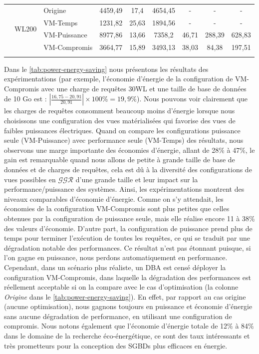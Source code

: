 \begin{table}
\begin{tabular}{cllcccccc}
    \noalign{\smallskip}
    \cline{2-9}
    \noalign{\smallskip}
    &     \multirow{4}{*}{WL200}   & Origine & 4459,49 & 17,4 & 4654,45 & - & - &    -      \\
 &  &     VM-Temps         & 1231,82 & 25,63 & 1894,56 &  -  &  -  &    -      \\
    &       &     VM-Puissance        & 8977,86 & 13,66 & 7358,2 &  46,71  &  288,39  &    628,83      \\
    &       &     VM-Compromis    & 3664,77 & 15,89 & 3493,13 &  38,03  &  84,38  &    197,51      \\
    \noalign{\smallskip}
    \bottomrule
\end{tabular}
\end{table}

Dans le \ref{tab:power-energy-saving} nous présentons les résultats des expérimentations (par exemple, l'économie d'énergie de la configuration de VM-Compromis avec une charge de requêtes 30WL et une taille de base de données de 10 Go est : $|\frac{16,75 - 20,91}{20,91}| \times 100\% = 19,9\%$). Nous pouvons voir clairement que les charges de requêtes consomment beaucoup moins d'énergie lorsque nous choisissons une configuration des vues matérialisées qui favorise des vues de faibles puissances électriques. Quand on compare les configurations puissance seule (VM-Puissance) avec performance seule (VM-Temps) des résultats, nous observons une marge importante des économies d'énergie, allant de 28\% à 47\%, le gain est remarquable quand nous allons de petite à grande taille de base de données et de charges de requêtes, cela est dû à la diversité des configurations de vues possibles en $\mathcal{GGR}$ d'une grande taille et leur impact sur la performance/puissance des systèmes. Ainsi, les expérimentations montrent des niveaux comparables d'économie d'énergie.
Comme on s'y attendait, les économies de la configuration VM-Compromis sont plus petites que celles obtenues par la configuration de puissance seule, mais elle réalise encore 11 à 38\% des valeurs d'économie.
D'autre part, la configuration de puissance prend plus de temps pour terminer l'exécution de toutes les requêtes, ce qui se traduit par une dégradation notable des performances. Ce résultat n'est pas étonnant puisque, si l'on gagne en puissance, nous perdons automatiquement en performance. Cependant, dans un scénario plus réaliste, un DBA est censé déployer la configuration VM-Compromis, dans laquelle la dégradation des performances est réellement acceptable si on la compare avec le cas d'optimisation (la colonne \textit{Origine} dans le \ref{tab:power-energy-saving}). En effet, par rapport au cas origine (aucune optimisation), nous gagnons toujours en puissance et économie d'énergie sans aucune dégradation de performance, en utilisant une configuration de compromis. Nous notons également que l'économie d'énergie totale de 12\% à 84\% dans le domaine de la recherche éco-énergétique, ce sont des taux intéressants et très prometteurs pour la conception des SGBDs plus efficaces en énergie.
